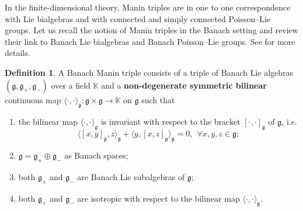 \documentclass[a4paper,12pt,reqno]{amsart}%
\theoremstyle{definition}
\newtheorem{definition}[theorem]{Definition}
\theoremstyle{remark}
\numberwithin{theorem}{section}
\numberwithin{equation}{section}
\newcommand{\1}{{\bf 1}}
\newcommand{\g}{{\mathfrak g}}
\begin{document}
In the finite-dimensional theory, Manin triples are in one to one correspondence with Lie bialgebras and with connected and simply connected Poisson--Lie groups. Let us recall the notion of Manin triples in the Banach setting and review their link to Banach Lie bialgebras and Banach Poisson--Lie groups. See \cite{tumpach-bruhat} for more details.



\begin{definition}
A Banach Manin triple consists of a triple of Banach Lie algebras $(\mathfrak{g}, \mathfrak{g}_+, \mathfrak{g}_-)$ over a field $\mathbb{K}$ and a \textbf{non-degenerate symmetric bilinear} continuous map $\langle\cdot, \cdot\rangle_{\!\mathfrak{g}}:\g\times\g\rightarrow \mathbb{K}$ on $\mathfrak{g}$ such that 
\begin{enumerate}
\item the bilinear map $\langle\cdot,\cdot\rangle_{\!\mathfrak{g}}$ is invariant with respect to the bracket $[\cdot, \cdot]_{\mathfrak{g}}$ of $\mathfrak{g}$, i.e.
\begin{equation}\label{invariance_bilinear_map}
\langle [x, y]_{\mathfrak{g}}, z\rangle_{\!\mathfrak{g}}  + \langle y, [x, z]_{\mathfrak{g}}\rangle_{\!\mathfrak{g}} = 0,~~\forall x, y, z \in \mathfrak{g};
\end{equation}
\item $\mathfrak{g} = \mathfrak{g}_+\oplus\mathfrak{g}_-$ as Banach spaces;
\item both $\mathfrak{g}_+$ and $\mathfrak{g}_-$ are Banach Lie subalgebras of $\mathfrak{g}$;
\item both $\mathfrak{g}_+$ and $\mathfrak{g}_-$ are isotropic with respect to the bilinear map $\langle\cdot,\cdot\rangle_{\!\mathfrak{g}}$.
\end{enumerate}
\end{definition}
\end{document}
